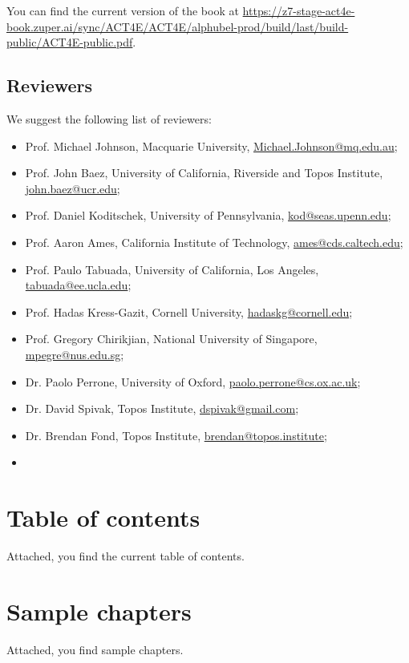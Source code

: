\documentclass[10pt, article, one side]{memoir}
\begin{document}
    You can find the current version of the book at \href{https://z7-stage-act4e-book.zuper.ai/sync/ACT4E/ACT4E/alphubel-prod/build/last/build-public/ACT4E-public.pdf}{https://z7-stage-act4e-book.zuper.ai/sync/ACT4E/ACT4E/alphubel-prod/build/last/build-public/ACT4E-public.pdf}.

    \section{Reviewers}
    We suggest the following list of reviewers:
    \begin{itemize}
        \item Prof.
              Michael Johnson, Macquarie University, \href{mailto:Michael.Johnson@mq.edu.au}{Michael.Johnson@mq.edu.au};
        \item Prof.
              John Baez, University of California, Riverside and Topos Institute, \href{mailto:john.baez@ucr.edu}{john.baez@ucr.edu};
        \item Prof.
              Daniel Koditschek, University of Pennsylvania, \href{mailto:kod@seas.upenn.edu}{kod@seas.upenn.edu};
        \item Prof.
              Aaron Ames, California Institute of Technology, \href{mailto:ames@cds.caltech.edu}{ames@cds.caltech.edu};
        \item Prof.
              Paulo Tabuada, University of California, Los Angeles, \href{mailto:tabuada@ee.ucla.edu}{tabuada@ee.ucla.edu};
        \item Prof.
              Hadas Kress-Gazit, Cornell University, \href{mailto:hadaskg@cornell.edu}{hadaskg@cornell.edu};
        \item Prof.
              Gregory Chirikjian, National University of Singapore, \href{mailto:mpegre@nus.edu.sg}{mpegre@nus.edu.sg};
        \item Dr.
              Paolo Perrone, University of Oxford, \href{mailto:paolo.perrone@cs.ox.ac.uk}{paolo.perrone@cs.ox.ac.uk};
        \item Dr.
              David Spivak, Topos Institute, \href{mailto:dspivak@gmail.com}{dspivak@gmail.com};
        \item Dr.
              Brendan Fond, Topos Institute, \href{mailto:brendan@topos.institute}{brendan@topos.institute};
        \item {}
    \end{itemize}

    \chapter{Table of contents}
    Attached, you find the current table of contents.

    \chapter{Sample chapters}
    Attached, you find sample chapters.
\end{document}
